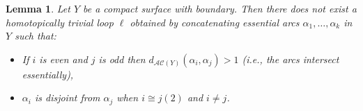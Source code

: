 \documentclass[11pt, oneside]{amsart}
\newtheorem{lemma}{Lemma}[section]
\theoremstyle{definition}
\theoremstyle{definition}
\begin{document}
\begin{lemma}\label{lem:concat_fill_arcs}
Let $Y$ be a compact surface with boundary. Then there does not exist a homotopically trivial loop $\ell$ obtained by concatenating essential arcs $\alpha_1,\dots,\alpha_k$ in  $Y$ such that:
  \begin{itemize}
   \item If $i$ is even and $j$ is odd then $d_{\mathcal{AC}(Y)}(\alpha_i,\alpha_j)> 1$ (i.e., the arcs intersect essentially),
   \item $\alpha_i$ is disjoint from $\alpha_j$ when $i\cong j (2)$ and $i\neq j$. 
  \end{itemize}
\end{lemma}
\end{document}
